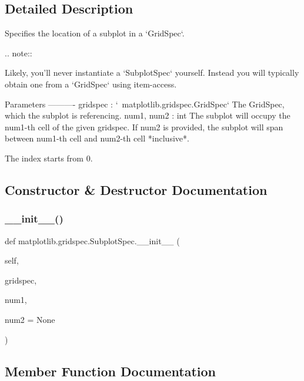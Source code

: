 \subsection{Detailed Description}
\begin{DoxyVerb}Specifies the location of a subplot in a `GridSpec`.

.. note::

    Likely, you'll never instantiate a `SubplotSpec` yourself. Instead you
    will typically obtain one from a `GridSpec` using item-access.

Parameters
----------
gridspec : `~matplotlib.gridspec.GridSpec`
    The GridSpec, which the subplot is referencing.
num1, num2 : int
    The subplot will occupy the num1-th cell of the given
    gridspec.  If num2 is provided, the subplot will span between
    num1-th cell and num2-th cell *inclusive*.

    The index starts from 0.
\end{DoxyVerb}
 

\subsection{Constructor \& Destructor Documentation}
\mbox{\label{classmatplotlib_1_1gridspec_1_1SubplotSpec_a9ab813f61256a11e4f13973be721d995}} 
\subsubsection{\texorpdfstring{\+\_\+\+\_\+init\+\_\+\+\_\+()}{\_\_init\_\_()}}
{\footnotesize\ttfamily def matplotlib.\+gridspec.\+Subplot\+Spec.\+\_\+\+\_\+init\+\_\+\+\_\+ (\begin{DoxyParamCaption}\item[{}]{self,  }\item[{}]{gridspec,  }\item[{}]{num1,  }\item[{}]{num2 = {\ttfamily None} }\end{DoxyParamCaption})}



\subsection{Member Function Documentation}
\mbox{\label{classmatplotlib_1_1gridspec_1_1SubplotSpec_a67b19f5309033d4182adcf7f6f86588e}} 
